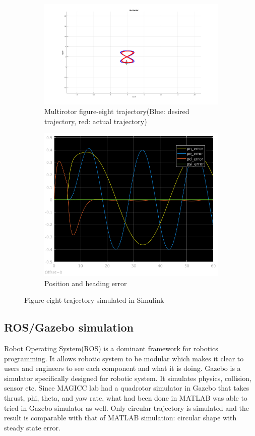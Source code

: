 \documentclass{article}
\begin{document}
\begin{figure}[h!]
	\centering
	\begin{subfigure}{.5\textwidth}
		\centering
		\includegraphics[width=0.9\linewidth]{simulink3.png}
		\caption{Multirotor figure-eight trajectory(Blue: desired trajectory, red: actual trajectory)}
		\label{simulink1}
	\end{subfigure}%
	\begin{subfigure}{.5\textwidth}
		\centering
		\includegraphics[width=0.7\linewidth]{simulink4.png}
		\caption{Position and heading error}
		\label{simulink2}
	\end{subfigure}
	\caption{Figure-eight trajectory simulated in Simulink}
	\label{eight}
\end{figure}

\subsection*{ROS/Gazebo simulation}
Robot Operating System(ROS) is a dominant framework for robotics programming. It allows robotic system to be modular which makes it clear to users and engineers to see each component and what it is doing. Gazebo is a simulator specifically designed for robotic system. It simulates physics, collision, sensor etc. Since MAGICC lab had a quadrotor simulator in Gazebo that takes thrust, phi, theta, and yaw rate, what had been done in MATLAB was able to tried in Gazebo simulator as well. Only circular trajectory is simulated and the result is comparable with that of MATLAB simulation: circular shape with steady state error.
\end{document}
